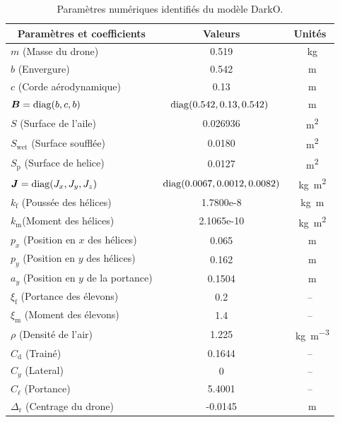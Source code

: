 \begin{table}[ht]
    \centering
      \begin{tabular}{|l|c|c|}
        \hline
        \multicolumn{1}{|c|}{Paramètres et coefficients} & Valeurs & Unités \\
        \hline
        $m$ (Masse du drone)  & 0.519 & \SI{}{\kilogram} \\
        \hline
        $b$ (Envergure)  & 0.542 & \SI{}{\meter} \\
        \hline
        $c$ (Corde aérodynamique)  & 0.13 & \SI{}{\meter} \\
        \hline
        $\boldsymbol{B}=\operatorname{diag}(b,c,b)$ & $\!\!\operatorname{diag}(0.542, 0.13, 0.542)$ \!\! & \SI{}{\meter}\\
        \hline
        $S$ (Surface de l'aile) & 0.026936 & \SI{}{\square\meter}\\
        \hline
        $S_{\text{wet}}$ (Surface soufflée) & 0.0180 & \SI{}{\square\meter}\\
        \hline
        $S_{\text{p}}$ (Surface de helice) & 0.0127 & \SI{}{\square\meter}\\
        \hline
        $\boldsymbol{J}=\operatorname{diag}(J_{x},J_{y},J_{z})$ & \!\! $\operatorname{diag}(0.0067,0.0012,0.0082)$\!\! & \SI{}{\kilogram\square\meter}\\
        \hline
        $k_{\text{f}}$ (Poussée des hélices) & 1.7800e-8 & \SI{}{\kilogram\meter}\\
        \hline
        $k_{\text{m}}$(Moment des hélices) & 2.1065e-10 & \SI{}{\kilogram\square\meter}\\
        \hline
        $p_{x}$ (Position en $x$ des hélices) & 0.065 & \SI{}{\meter}\\
        \hline
        $p_{y}$ (Position en $y$  des hélices) & 0.162 & \SI{}{\meter}\\
        \hline
        $a_{y}$ (Position en $y$ de la portance) & 0.1504 & \SI{}{\meter}\\
        \hline
        $\xi_{\text{f}}$ (Portance des élevons) & 0.2 & --\\
        \hline
        $\xi_{\text{m}}$ (Moment des élevons) & 1.4 & --\\
        \hline
        $\rho$ (Densité de l'air) & 1.225 & \SI{}{\kilogram\per\cubic\meter}\\
        \hline
        $C_{\text{d}}$ (Trainé) & 0.1644 & --\\
        \hline
        $C_{y}$ (Lateral) & 0 & --\\
        \hline
         $C_{\ell}$ (Portance) & 5.4001 & --\\
        \hline
        $\Delta_{\text{r}}$ (Centrage du drone) & -0.0145 & \SI{}{\meter}\\
        \hline
      \end{tabular}
      \caption{\label{tab:pars} Paramètres numériques identifiés du modèle DarkO.}
\end{table}

